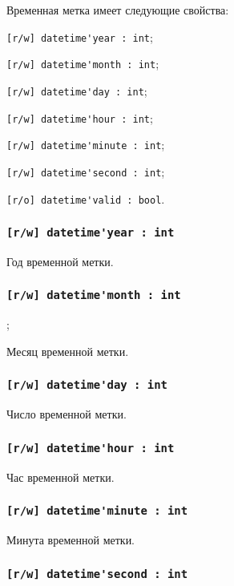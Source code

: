 Временная метка имеет следующие свойства:
\begin{icItems}
	\item \lstinline|[r/w] datetime'year : int|;
	\item \lstinline|[r/w] datetime'month : int|;
	\item \lstinline|[r/w] datetime'day : int|;
	\item \lstinline|[r/w] datetime'hour : int|;
	\item \lstinline|[r/w] datetime'minute : int|;
	\item \lstinline|[r/w] datetime'second : int|;
	\item \lstinline|[r/o] datetime'valid : bool|.
\end{icItems}

\subsubsection{\lstinline|[r/w] datetime'year : int|}

Год временной метки.

\subsubsection{\lstinline|[r/w] datetime'month : int|};

Месяц временной метки.

\subsubsection{\lstinline|[r/w] datetime'day : int|}

Число временной метки.

\subsubsection{\lstinline|[r/w] datetime'hour : int|}

Час временной метки.

\subsubsection{\lstinline|[r/w] datetime'minute : int|}

Минута временной метки.

\subsubsection{\lstinline|[r/w] datetime'second : int|}

